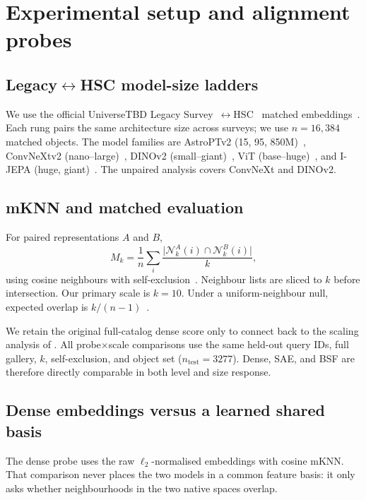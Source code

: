 \documentclass{article}
\begin{document}
\section{Experimental setup and alignment probes}
\label{sec:setup}

\subsection{Legacy\(\leftrightarrow\)HSC model-size ladders}

We use the official UniverseTBD Legacy Survey~\citep{dey2019legacy}\(\leftrightarrow\)HSC~\citep{miyazaki2018hsc} matched embeddings~\citep{duraphe2025platonicuniverse}.
Each rung pairs the same architecture size across surveys; we use \(n{=}16{,}384\) matched objects.
The model families are AstroPTv2 (15, 95, 850M)~\citep{smith2024astropt},
ConvNeXtv2 (nano--large)~\citep{woo2023convnextv2},
DINOv2 (small--giant)~\citep{oquab2024dinov2},
ViT (base--huge)~\citep{dosovitskiy2021vit},
and I-JEPA (huge, giant)~\citep{assran2023ijepa}.
The unpaired analysis covers ConvNeXt and DINOv2.

\subsection{mKNN and matched evaluation}

For paired representations \(A\) and \(B\),
\[
M_k=\frac{1}{n}\sum_i
\frac{\lvert \mathcal N_k^A(i)\cap \mathcal N_k^B(i)\rvert}{k},
\]
using cosine neighbours with self-exclusion~\citep{huh2024platonic,duraphe2025platonicuniverse}.
Neighbour lists are sliced to \(k\) before intersection.
Our primary scale is \(k{=}10\).
Under a uniform-neighbour null, expected overlap is \(k/(n{-}1)\)~\citep{groger2026aristotelian}.

We retain the original full-catalog dense score only to connect back to the scaling analysis of \citet{duraphe2025platonicuniverse}.
All probe\(\times\)scale comparisons use the same held-out query IDs, full gallery, \(k\), self-exclusion, and object set (\(n_{\mathrm{test}}{=}3277\)).
Dense, SAE, and BSF are therefore directly comparable in both level and size response.

\subsection{Dense embeddings versus a learned shared basis}

The dense probe uses the raw \(\ell_2\)-normalised embeddings with cosine mKNN.
That comparison never places the two models in a common feature basis: it only asks whether neighbourhoods in the two native spaces overlap.
\end{document}
